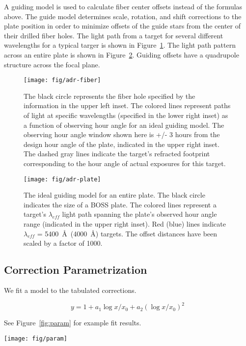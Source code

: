 \documentclass[preprint2]{aastex}
\providecommand{\fig}[1]{Figure~\ref{fig:#1}}
\begin{document}
A guiding model is used to calculate fiber center offsets instead of the formulas above. The guide model determines scale, rotation, and shift corrections to the plate position in order to minimize offsets of the guide stars from the center of their drilled fiber holes. The light path from a target for several different wavelengths for a typical targer is shown in \fig{fiber_hole}. The light path pattern across an entire plate is shown in \fig{plate_guide}. Guiding offsets have a quadrupole structure across the focal plane.

\begin{figure}
\centering
\texttt{[image: fig/adr-fiber]}
\caption{The black circle represents the fiber hole specified by the information in the upper left inset. The colored lines represent paths of light at specific wavelengths (specified in the lower right inset) as a function of observing hour angle for an ideal guiding model. The observing hour angle window shown here is +/- 3 hours from the design hour angle of the plate, indicated in the upper right inset. The dashed gray lines indicate the target's refracted footprint corresponding to the hour angle of actual exposures for this target.}
\label{fig:fiber_hole}
\end{figure}

\begin{figure}
\centering
\texttt{[image: fig/adr-plate]}
\caption{The ideal guiding model for an entire plate. The black circle indicates the size of a BOSS plate. The colored lines represent a target's $\lambda_{eff}$ light path spanning the plate's observed hour angle range (indicated in the upper right inset). Red (blue) lines indicate $\lambda_{eff}$ = 5400~\AA~(4000~\AA) targets. The offset distances have been scaled by a factor of 1000.}
\label{fig:plate_guide}
\end{figure}

\subsection{Correction Parametrization}

We fit a model to the tabulated corrections.

\begin{equation}
y = 1 + a_1 \log x/x_0 + a_2 (\log x/x_0)^2
\end{equation}

See \fig{param} for example fit results.

\begin{figure*}
\centering
\texttt{[image: fig/param]}
\caption{Example parametrization fit results.}
\label{fig:param}
\end{figure*}
\end{document}
